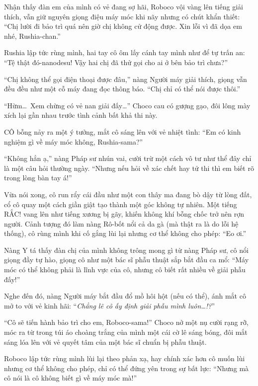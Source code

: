 \documentclass[../main.tex]{subfiles}
\begin{document}
Nhận thấy đàn em của mình có vẻ đang sợ hãi, Roboco vội vàng lên tiếng giải thích, vẫn giữ nguyên giọng điệu máy móc khi nãy nhưng có chút khẩn thiết: ``Chị lười đi bảo trì quá nên giờ chị không cử động được. Xin lỗi vì đã dọa em nhé, Rushia-chan.''

Rushia lập tức rùng mình, hai tay cô ôm lấy cánh tay mình như để tự trấn an: ``Tệ thật đó-nanodesu! Vậy hai chị đã thử gọi cho ai ở bên bảo trì chưa?''

``Chị không thể gọi điện thoại được đâu,'' nàng Người máy giải thích, giọng vẫn đều đều như một cỗ máy đang đọc thông báo. ``Chị chỉ có thể nói được thôi.''

``Hừm\dots\ Xem chừng có vẻ nan giải đấy\dots'' Choco cau có gượng gạo, đôi lông mày xích lại gần nhau trước tình cảnh bất khả thi này.

CÔ bỗng nảy ra một ý tưởng, mắt cô sáng lên với vẻ nhiệt tình: ``Em có kinh nghiệm gì về máy móc không, Rushia-sama?''

``Không hẳn ạ,'' nàng Pháp sư nhún vai, cười trừ một cách vô tư như thể đây chỉ là một câu hỏi thường ngày. ``Nhưng nếu hỏi về xác chết hay tử thi thì em biết rõ trong lòng bàn tay á!''

Vừa nói xong, cô run rẩy cái đầu như một con thây ma đang bò dậy từ lòng đất, cổ cô quay một cách giần giật tạo thành một góc không tự nhiên. Một tiếng RẮC! vang lên như tiếng xương bị gãy, khiến không khí bỗng chốc trở nên rợn người. Cảnh tượng đó làm nàng Rô-bốt nổi cả da gà (mà thật ra là do lỗi hệ thống), cô rùng mình khi cố gắng lùi lại nhưng cơ thể không cho phép: ``Eo ơi.''


Nàng Y tá thấy đàn chị của mình không trông mong gì từ nàng Pháp sư, cô nổi giọng đầy tự hào, giọng cô như một bác sĩ phẫu thuật sắp bắt đầu ca mổ: ``Máy móc có thể không phải là lĩnh vực của cô, nhưng cô biết rất nhiều về giải phẫu đấy!''

Nghe đến đó, nàng Người máy bắt đầu đổ mồ hôi hột (nếu có thể), ánh mắt cô mở to với vẻ kinh hãi: ``\textit{Chẳng lẽ cô ấy định giải phẫu mình luôn\dots!?}''

``Cô sẽ tiến hành bảo trì cho em, Roboco-sama!'' Choco nở một nụ cười rạng rỡ, móc ra từ trong túi áo choàng trắng của mình một cái cờ lê sáng bóng, đôi mắt sáng lóa lên với vẻ quyết tâm của một bác sĩ chuẩn bị phẫu thuật.


Roboco lập tức rùng mình lùi lại theo phản xạ, hay chính xác hơn cô muốn lùi nhưng cơ thể không cho phép, chỉ có thể đứng yên trong sự bất lực: ``Nhưng mà cô nói là cô không biết gì về máy móc mà!''
\end{document}
